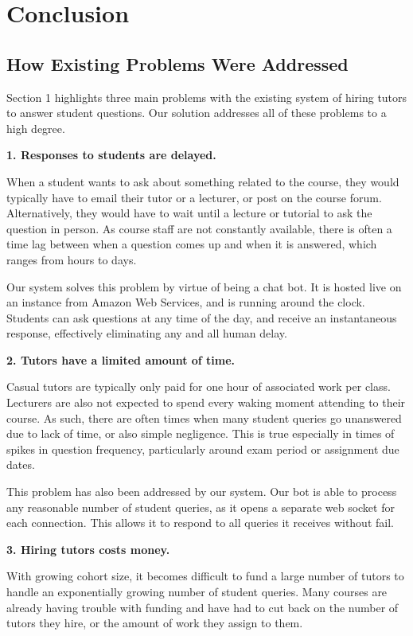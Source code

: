 \section{Conclusion}
\subsection{How Existing Problems Were Addressed}
Section 1 highlights three main problems with the existing system of hiring tutors to answer student questions. Our solution addresses all of these problems to a high degree.

\textbf{1. Responses to students are delayed.}

When a student wants to ask about something related to the course, they would typically have to email their tutor or a lecturer, or post on the course forum. Alternatively, they would have to wait until a lecture or tutorial to ask the question in person. As course staff are not constantly available, there is often a time lag between when a question comes up and when it is answered, which ranges from hours to days.

Our system solves this problem by virtue of being a chat bot. It is hosted live on an  instance from Amazon Web Services, and is running around the clock. Students can ask questions at any time of the day, and receive an instantaneous response, effectively eliminating any and all human delay.

\textbf{2. Tutors have a limited amount of time.}

Casual tutors are typically only paid for one hour of associated work per class. Lecturers are also not expected to spend every waking moment attending to their course. As such, there are often times when many student queries go unanswered due to lack of time, or also simple negligence. This is true especially in times of spikes in question frequency, particularly around exam period or assignment due dates.

This problem has also been addressed by our system. Our bot is able to process any reasonable number of student queries, as it opens a separate web socket for each connection. This allows it to respond to all queries it receives without fail.

\textbf{3. Hiring tutors costs money.}

With growing cohort size, it becomes difficult to fund a large number of tutors to handle an exponentially growing number of student queries. Many courses are already having trouble with funding and have had to cut back on the number of tutors they hire, or the amount of work they assign to them.

